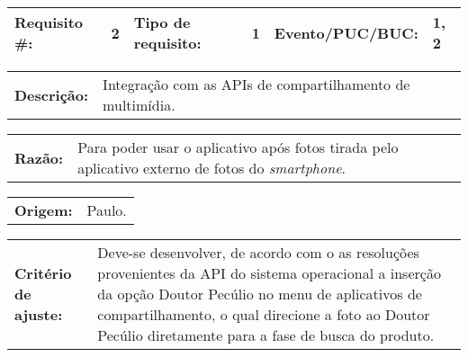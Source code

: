 
\par \noindent
\begin{table}[h]
    \begin{tabularx}{\textwidth}{
        p{}
        p{}
        p{}
        p{}
        p{}
        p{}
    }
    \toprule
        \textbf{Requisito \#:}          & 2
        & \textbf{Tipo de requisito:}   & 1
        & \textbf{Evento/PUC/BUC:}      & 1, 2 \\
    \midrule
    \end{tabularx}
    \vspace{5pt}
    \begin{tabularx}{\textwidth}{p{}  p{}}
        \textbf{Descrição:} &
        Integração com as APIs de compartilhamento de multimídia.
    \end{tabularx}
    
    \vspace{5pt}
    \begin{tabularx}{\textwidth}{p{}  p{}}
        \textbf{Razão:} &
        Para poder usar o aplicativo após fotos tirada pelo aplicativo
        externo de fotos do \emph{smartphone}.
    \end{tabularx}
    
    \vspace{5pt}
    \begin{tabularx}{\textwidth}{p{} p{}}
        \textbf{Origem:} &
        Paulo.
    \end{tabularx}
    
    \vspace{5pt}
    \begin{tabularx}{\textwidth}{p{} p{}}
        \textbf{Critério de ajuste:} &
        Deve-se desenvolver, de acordo com o as resoluções provenientes 
        da API do sistema operacional a inserção da opção 
        Doutor Pecúlio no menu de aplicativos de compartilhamento,
        o qual direcione a foto ao Doutor Pecúlio diretamente para a
        fase de busca do produto.
    \end{tabularx}
    

\end{table}
